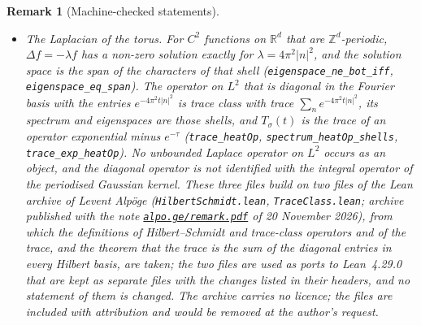 \documentclass[11pt,a4paper]{article}
\theoremstyle{stmt}
\theoremstyle{defn}
\theoremstyle{rmk}
\newtheorem{remark}[theorem]{Remark}
\numberwithin{equation}{section}
\newcommand{\R}{\mathbb{R}}
\begin{document}
{\begin{remark}[Machine-checked statements]
\begin{itemize}
\item \emph{The Laplacian of the torus.} For $C^2$ functions on $\R^d$ that are $\mathbb Z^d$-periodic, $\Delta f=-\lambda f$ has a non-zero solution exactly for $\lambda=4\pi^2|n|^2$, and the solution space is the span of the characters of that shell (\texttt{eigenspace\_ne\_bot\_iff}, \texttt{eigenspace\_eq\_span}). The operator on $L^2$ that is diagonal in the Fourier basis with the entries $e^{-4\pi^2t|n|^2}$ is trace class with trace $\sum_ne^{-4\pi^2t|n|^2}$, its spectrum and eigenspaces are those shells, and $T_\sigma(t)$ is the trace of an operator exponential minus $e^{-\tau}$ (\texttt{trace\_heatOp}, \texttt{spectrum\_heatOp\_shells}, \texttt{trace\_exp\_heatOp}). No unbounded Laplace operator on $L^2$ occurs as an object, and the diagonal operator is not identified with the integral operator of the periodised Gaussian kernel. These three files build on two files of the Lean archive of Levent Alp\"oge (\texttt{HilbertSchmidt.lean}, \texttt{TraceClass.lean}; archive published with the note \href{https://alpo.ge/remark.pdf}{\texttt{alpo.ge/remark.pdf}} of 20 November 2026), from which the definitions of Hilbert--Schmidt and trace-class operators and of the trace, and the theorem that the trace is the sum of the diagonal entries in every Hilbert basis, are taken; the two files are used as ports to Lean~4.29.0 that are kept as separate files with the changes listed in their headers, and no statement of them is changed. The archive carries no licence; the files are included with attribution and would be removed at the author's request.
\end{itemize}


\end{remark}}
\end{document}
